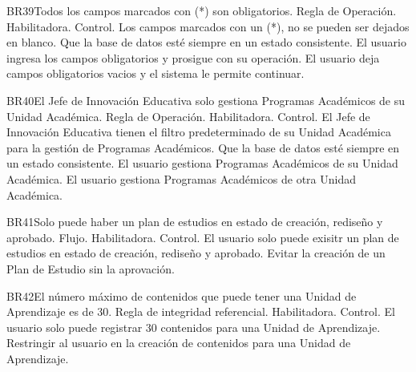 \begin{BussinesRule}{BR39}{Todos los campos marcados con (*) son obligatorios.}
    \BRitem[Tipo:] Regla de Operación.
    \BRitem[Clase:] Habilitadora.
    \BRitem[Nivel:] Control.
    \BRitem[Descripción:] Los campos marcados con un (*), no se pueden ser dejados en blanco.
    \BRitem[Sentencia:]
    \BRitem[Motivación: ]Que la base de datos esté siempre en un estado consistente.
     El usuario ingresa los campos obligatorios y prosigue con su operación.
    El usuario deja campos obligatorios vacios y el sistema le permite continuar.
\end{BussinesRule}
\begin{BussinesRule}{BR40}{El Jefe de Innovación Educativa solo gestiona Programas Académicos de su Unidad Académica.}
    \BRitem[Tipo:] Regla de Operación.
    \BRitem[Clase:] Habilitadora.
    \BRitem[Nivel:] Control.
    \BRitem[Descripción:] El Jefe de Innovación Educativa tienen el filtro predeterminado de su Unidad Académica para la gestión de Programas Académicos.
    \BRitem[Sentencia:]
    \BRitem[Motivación: ]Que la base de datos esté siempre en un estado consistente.
     El usuario gestiona Programas Académicos de su Unidad Académica.
    El usuario gestiona Programas Académicos de otra Unidad Académica.
\end{BussinesRule}
   \begin{BussinesRule}{BR41}{Solo puede haber un plan de estudios en estado de creación, rediseño y aprobado.}
     \BRitem[Tipo:] Flujo.
     \BRitem[Clase:] Habilitadora.
     \BRitem[Nivel:] Control.
     \BRitem[Descripción:] El usuario solo puede exisitr un plan de estudios en estado de creación, rediseño y aprobado.
     \BRitem[Motivación:] Evitar la creación de un Plan de Estudio sin la aprovación.
  \end{BussinesRule}

   \begin{BussinesRule}{BR42}{El número máximo de contenidos que puede tener una Unidad de Aprendizaje es de 30.}
     \BRitem[Tipo:] Regla de integridad referencial.
     \BRitem[Clase:] Habilitadora.
     \BRitem[Nivel:] Control.
     \BRitem[Descripción:] El usuario solo puede registrar 30 contenidos para una Unidad de Aprendizaje.
     \BRitem[Motivación:] Restringir al usuario en la creación de contenidos para una Unidad de Aprendizaje.
  \end{BussinesRule}
  
